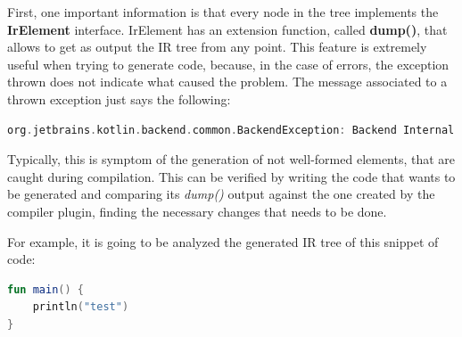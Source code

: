 First, one important information is that every node in the tree implements the \textbf{IrElement} interface. IrElement has an extension function, called \textbf{dump()}, that allows to get as output the IR tree from any point.\newline
This feature is extremely useful when trying to generate code, because, in the case of errors, the exception thrown does not indicate what caused the problem. The message associated to a thrown exception just says the following:
\begin{lstlisting}[caption={Kotlin IR lowering Exception}, language=Kotlin, captionpos=b, label={code:ir_lowering_exception}]
org.jetbrains.kotlin.backend.common.BackendException: Backend Internal error: Exception during IR lowering
\end{lstlisting}
Typically, this is symptom of the generation of not well-formed elements, that are caught during compilation. This can be verified by writing the code that wants to be generated and comparing its \textit{dump()} output against the one created by the compiler plugin, finding the necessary changes that needs to be done.

For example, it is going to be analyzed the generated IR tree of this snippet of code:
\begin{lstlisting}[caption={Kotlin basic code to demostrate the Kotlin IR representation}, language=Kotlin, captionpos=b, label={code:kotlin_for_ir_tree}]
fun main() {
    println("test")
}
\end{lstlisting}

